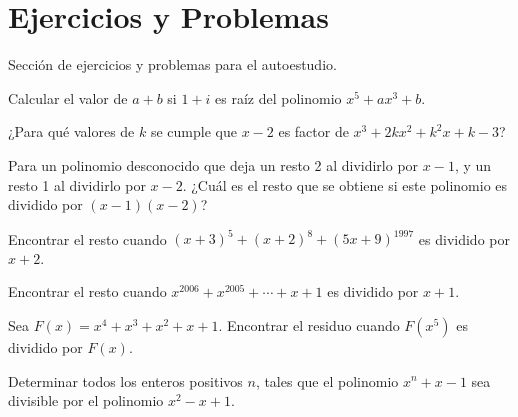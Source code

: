 \section{Ejercicios y Problemas}
{
    Sección de ejercicios y problemas para el autoestudio.

    \begin{section-problem}
        Calcular el valor de $a + b$ si $1 + i$ es raíz del polinomio $x^5 + ax^3 + b$.
    \end{section-problem}

    \begin{section-problem}
        ¿Para qué valores de $k$ se cumple que $x - 2$ es factor de $x^3 + 2kx^2 + k^2 x + k - 3$?
    \end{section-problem}

    \begin{section-problem}
        Para un polinomio desconocido que deja un resto 2 al dividirlo por $x - 1$, y un resto 1 al dividirlo por $x - 2$.
        ¿Cuál es el resto que se obtiene si este polinomio es dividido por $(x - 1)(x - 2)$?
    \end{section-problem}

    \begin{section-problem}
        Encontrar el resto cuando $(x + 3)^5 + (x + 2)^8 + (5x + 9)^{1997}$ es dividido por $x + 2$.
    \end{section-problem}

    \begin{section-problem}
        Encontrar el resto cuando $x^{2006} + x^{2005} + \cdots + x + 1$ es dividido por $x + 1$.
    \end{section-problem}

    \begin{section-problem}
        Sea $F(x) = x^4 + x^3 + x^2 + x + 1$.
        Encontrar el residuo cuando $F(x^5)$ es dividido por $F(x)$.
    \end{section-problem}

    \begin{section-problem}
        Determinar todos los enteros positivos $n$, tales que el polinomio $x^n + x - 1$ sea divisible por el polinomio $x^2 - x + 1$.
    \end{section-problem}
}